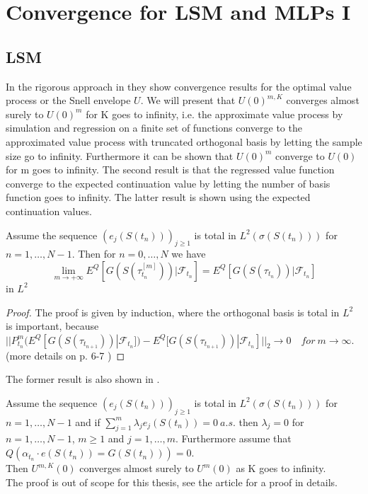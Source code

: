 \section{Convergence for LSM and MLPs I}\label{Convergence}
\subsection{LSM}
In the rigorous approach in \parencite{analysisLSM} they show convergence results for the optimal value process or the Snell envelope $U$. We will present that $U(0)^{m,K}$ converges almost surely to $U(0)^{m}$ for K goes to infinity, i.e. the approximate value process by simulation and regression on a finite set of functions converge to the approximated value process with truncated orthogonal basis by letting the sample size go to infinity. Furthermore it can be shown that $U(0)^{m}$ converge to $U(0)$ for m goes to infinity. The second result is that the regressed value function converge to the expected continuation value by letting the number of basis function goes to infinity. The latter result is shown using the expected continuation values.
\begin{theorem}\label{LSMConvergence1}
Assume the sequence $(e_{j}(S(t_n)))_{j\geq 1}$ is total in $L^2(\sigma(S(t_n)))$ for $n=1,\ldots,N-1$. Then for $n=0,\ldots,N$ we have
$$\lim_{m\to +\infty} E^Q[G(S(\tau_{t_n}^{[m]})) |\mathcal{F}_{t_n}]=E^Q[G(S(\tau_{t_n})) |\mathcal{F}_{t_n}]$$
in $L^2$
\begin{proof}
The proof is given by induction, where the orthogonal basis is total in $L^2$ is important, because $||P^m_{t_n}(E^Q[G(S(\tau_{t_{n+1}}))|\mathcal{F}_{t_n}])- E^Q[G(S(\tau_{t_{n+1}}))|\mathcal{F}_{t_n}]||_2 \to 0 \quad for \ m \to \infty$.
(more details on p. 6-7 \parencite{analysisLSM})
\end{proof}
\end{theorem}

The former result is also shown in \parencite{analysisLSM}.
\begin{theorem}\label{LSMConvergence2}
Assume the sequence $(e_{j}(S(t_n)))_{j\geq 1}$ is total in $L^2(\sigma(S(t_n)))$ for $n=1,\ldots,N-1$ and if $\sum_{j=1}^{m} \lambda_j e_{j}(S(t_n))=0 \ a.s.$ then $\lambda_j=0$ for $n=1,\ldots,N-1$, $m\geq 1$ and $j=1,\ldots,m$. Furthermore assume that $Q(\alpha_{t_n} \cdot e(S(t_n))=G(S(t_n)))=0$.\\
Then $U^{m,K}(0)$ converges almost surely to $U^{m}(0)$ as K goes to infinity.\\
The proof is out of scope for this thesis, see the article \parencite{analysisLSM} for a proof in details. 
\end{theorem}

